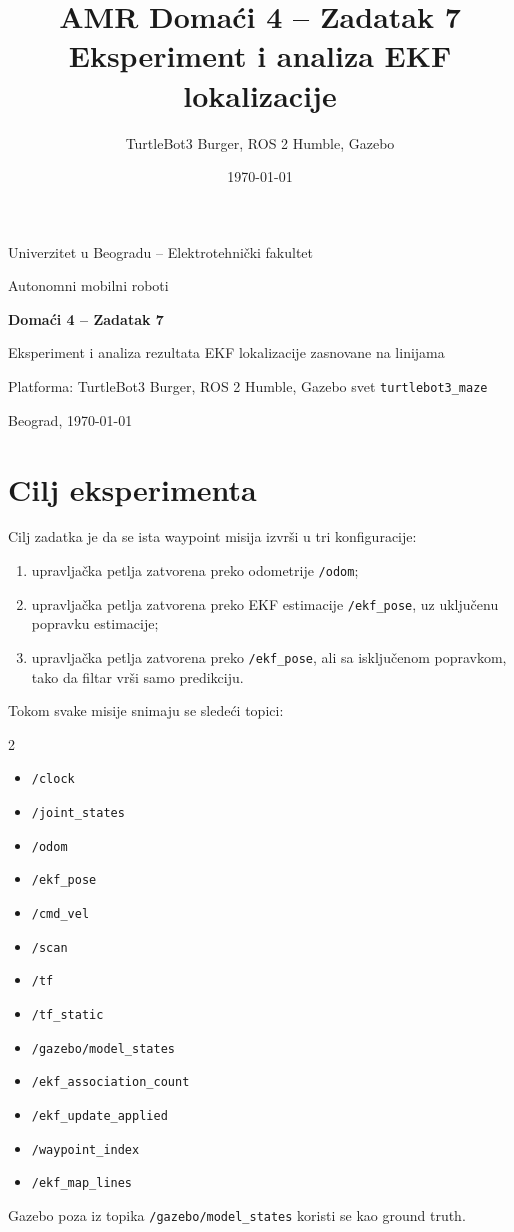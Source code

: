\documentclass[a4paper,12pt]{article}
\title{AMR Domaći 4 -- Zadatak 7\\Eksperiment i analiza EKF lokalizacije}
\author{TurtleBot3 Burger, ROS 2 Humble, Gazebo}
\date{\today}
\begin{document}
\begin{titlepage}
\centering
{\Large Univerzitet u Beogradu -- Elektrotehnički fakultet\par}
\vspace{1.5cm}
{\large Autonomni mobilni roboti\par}
\vspace{2.5cm}
{\huge\bfseries Domaći 4 -- Zadatak 7\par}
\vspace{0.5cm}
{\Large Eksperiment i analiza rezultata EKF lokalizacije zasnovane na linijama\par}
\vfill
{\large Platforma: TurtleBot3 Burger, ROS 2 Humble, Gazebo svet \texttt{turtlebot3\_maze}\par}
\vspace{0.5cm}
{\large Beograd, \today\par}
\end{titlepage}

\tableofcontents
\newpage

\section{Cilj eksperimenta}

Cilj zadatka je da se ista waypoint misija izvrši u tri konfiguracije:
\begin{enumerate}
    \item upravljačka petlja zatvorena preko odometrije \texttt{/odom};
    \item upravljačka petlja zatvorena preko EKF estimacije \texttt{/ekf\_pose}, uz uključenu popravku estimacije;
    \item upravljačka petlja zatvorena preko \texttt{/ekf\_pose}, ali sa isključenom popravkom, tako da filtar vrši samo predikciju.
\end{enumerate}

Tokom svake misije snimaju se sledeći topici:
\begin{multicols}{2}
\begin{itemize}
    \item \texttt{/clock}
    \item \texttt{/joint\_states}
    \item \texttt{/odom}
    \item \texttt{/ekf\_pose}
    \item \texttt{/cmd\_vel}
    \item \texttt{/scan}
    \item \texttt{/tf}
    \item \texttt{/tf\_static}
    \item \texttt{/gazebo/model\_states}
    \item \texttt{/ekf\_association\_count}
    \item \texttt{/ekf\_update\_applied}
    \item \texttt{/waypoint\_index}
    \item \texttt{/ekf\_map\_lines}
\end{itemize}
\end{multicols}
Gazebo poza iz topika \texttt{/gazebo/model\_states} koristi se kao ground truth.
\end{document}
